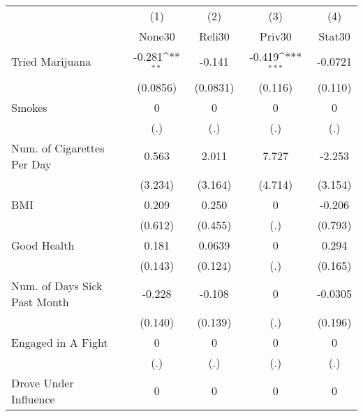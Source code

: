 {
\def\sym#1{\ifmmode^{#1}\else\(^{#1}\)\fi}
\begin{tabular}{l*{4}{c}}
\hline\hline
            &\multicolumn{1}{c}{(1)}&\multicolumn{1}{c}{(2)}&\multicolumn{1}{c}{(3)}&\multicolumn{1}{c}{(4)}\\
            &\multicolumn{1}{c}{None30}&\multicolumn{1}{c}{Reli30}&\multicolumn{1}{c}{Priv30}&\multicolumn{1}{c}{Stat30}\\
\hline
Tried Marijuana&      -0.281\sym{**} &      -0.141         &      -0.419\sym{***}&     -0.0721         \\
            &    (0.0856)         &    (0.0831)         &     (0.116)         &     (0.110)         \\
[1em]
Smokes      &           0         &           0         &           0         &           0         \\
            &         (.)         &         (.)         &         (.)         &         (.)         \\
[1em]
Num. of Cigarettes Per Day&       0.563         &       2.011         &       7.727         &      -2.253         \\
            &     (3.234)         &     (3.164)         &     (4.714)         &     (3.154)         \\
[1em]
BMI         &       0.209         &       0.250         &           0         &      -0.206         \\
            &     (0.612)         &     (0.455)         &         (.)         &     (0.793)         \\
[1em]
Good Health &       0.181         &      0.0639         &           0         &       0.294         \\
            &     (0.143)         &     (0.124)         &         (.)         &     (0.165)         \\
[1em]
Num. of Days Sick Past Month&      -0.228         &      -0.108         &           0         &     -0.0305         \\
            &     (0.140)         &     (0.139)         &         (.)         &     (0.196)         \\
[1em]
Engaged in A Fight&           0         &           0         &           0         &           0         \\
            &         (.)         &         (.)         &         (.)         &         (.)         \\
[1em]
Drove Under Influence&           0         &           0         &           0         &           0         \\

\end{tabular}}
